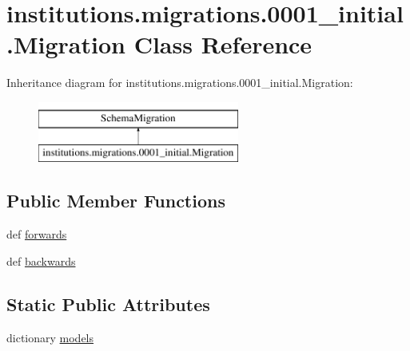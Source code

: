 \hypertarget{classinstitutions_1_1migrations_1_10001__initial_1_1_migration}{\section{institutions.\-migrations.0001\-\_\-initial.Migration Class Reference}
\label{classinstitutions_1_1migrations_1_10001__initial_1_1_migration}
}
Inheritance diagram for institutions.\-migrations.0001\-\_\-initial.Migration\-:\begin{figure}[H]
\begin{center}
\leavevmode
\includegraphics[height=2.000000cm]{classinstitutions_1_1migrations_1_10001__initial_1_1_migration}
\end{center}
\end{figure}
\subsection*{Public Member Functions}
\begin{DoxyCompactItemize}
\item 
def \hyperlink{classinstitutions_1_1migrations_1_10001__initial_1_1_migration_a72c9813fedfaa1f2a187f72dd43b7baa}{forwards}
\item 
def \hyperlink{classinstitutions_1_1migrations_1_10001__initial_1_1_migration_a1c285f34376b58627baca9986cf2cf8d}{backwards}
\end{DoxyCompactItemize}
\subsection*{Static Public Attributes}
\begin{DoxyCompactItemize}
\item 
dictionary \hyperlink{classinstitutions_1_1migrations_1_10001__initial_1_1_migration_ad0eddd5ffc4bd46c4472086da97ae229}{models}
\end{DoxyCompactItemize}


